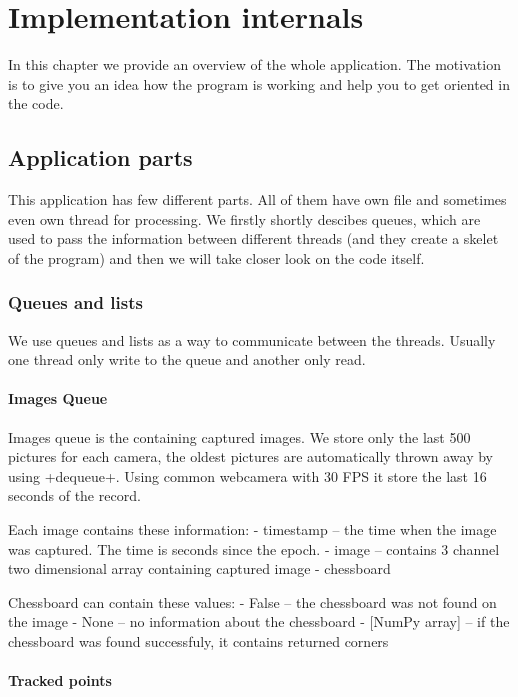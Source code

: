 \chapter{Implementation internals}

In this chapter we provide an overview of the whole application. The motivation
is to give you an idea how the program is working and help you to get oriented
in the code.

\section{Application parts}
This application has few different parts. All of them have own file and
sometimes even own thread for processing. We firstly shortly descibes queues, which are used to pass the information between different threads (and they create a skelet of the program) and then we will take closer look on the code itself.

\subsection{Queues and lists}

We use queues and lists as a way to communicate between the threads. Usually
one thread only write to the queue and another only read.

\subsubsection{Images Queue}

Images queue is the containing captured images. We store only the last 500
pictures for each camera, the oldest pictures are automatically thrown away by
using \vebr+dequeue+. Using common webcamera with 30 FPS it store the last 16
seconds of the record.

Each image contains these information:
- timestamp -- the time when the image was captured. The time is seconds since the epoch.
- image -- contains 3 channel two dimensional array containing captured image
- chessboard

Chessboard can contain these values:
- False -- the chessboard was not found on the image
- None -- no information about the chessboard
- [NumPy array] -- if the chessboard was found successfuly, it contains returned corners 

\subsubsection{Tracked points}




